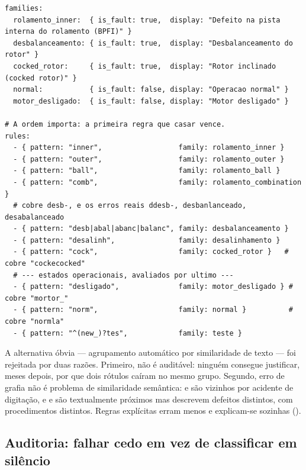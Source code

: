 \begin{lstlisting}[language=yamlpmx, caption={Extrato de \arq{src/etl/label\_map.yaml} --- declaração de famílias e regras ordenadas}, label={lst:labelmap}]
families:
  rolamento_inner:  { is_fault: true,  display: "Defeito na pista interna do rolamento (BPFI)" }
  desbalanceamento: { is_fault: true,  display: "Desbalanceamento do rotor" }
  cocked_rotor:     { is_fault: true,  display: "Rotor inclinado (cocked rotor)" }
  normal:           { is_fault: false, display: "Operacao normal" }
  motor_desligado:  { is_fault: false, display: "Motor desligado" }

# A ordem importa: a primeira regra que casar vence.
rules:
  - { pattern: "inner",                  family: rolamento_inner }
  - { pattern: "outer",                  family: rolamento_outer }
  - { pattern: "ball",                   family: rolamento_ball }
  - { pattern: "comb",                   family: rolamento_combination }
  # cobre desb-, e os erros reais ddesb-, desbanlanceado, desabalanceado
  - { pattern: "desb|abal|abanc|balanc", family: desbalanceamento }
  - { pattern: "desalinh",               family: desalinhamento }
  - { pattern: "cock",                   family: cocked_rotor }   # cobre "cockecocked"
  # --- estados operacionais, avaliados por ultimo ---
  - { pattern: "desligado",              family: motor_desligado } # cobre "mortor_"
  - { pattern: "norm",                   family: normal }          # cobre "normla"
  - { pattern: "^(new_)?tes",            family: teste }
\end{lstlisting}

\begin{decisao}
A alternativa óbvia --- agrupamento automático por similaridade de texto ---
foi rejeitada por duas razões. Primeiro, não é auditável: ninguém consegue
justificar, meses depois, por que dois rótulos caíram no mesmo grupo.
Segundo, erro de grafia não é problema de similaridade semântica:
 e  são vizinhos por acidente de digitação, e
 e  são textualmente próximos mas
descrevem defeitos distintos, com procedimentos distintos. Regras explícitas
erram menos e explicam-se sozinhas ().
\end{decisao}

\subsection{Auditoria: falhar cedo em vez de classificar em silêncio}

